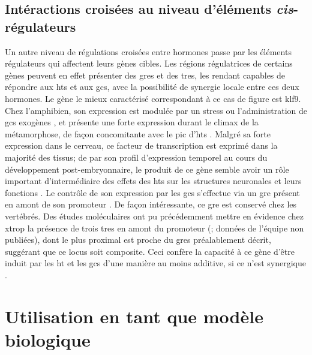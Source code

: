 \documentclass[../main.tex]{subfiles}
\begin{document}
	\subsection{Intéractions croisées au niveau d'éléments \textit{cis}-régulateurs}
		Un autre niveau de régulations croisées entre hormones passe par les éléments régulateurs qui affectent leurs gènes cibles.
		Les régions régulatrices de certains gènes peuvent en effet présenter des \glspl{gre} et des \glspl{tre}, les rendant capables de répondre aux \glspl{ht} et aux \glspl{gc}, avec la possibilité de synergie locale entre ces deux hormones.
		Le gène le mieux caractérisé correspondant à ce cas de figure est \gls{klf9}.
		Chez l'amphibien, son expression est modulée par un stress ou l'administration de \glspl{gc} exogènes \citep{Bonett2009}, et présente une forte expression durant le climax de la métamorphose, de façon concomitante avec le pic d'\glspl{ht} \citep{Das2009}.
		Malgré sa forte expression dans le cerveau, ce facteur de transcription est exprimé dans la majorité des tissus; de par son profil d'expression temporel au cours du développement post-embryonnaire, le produit de ce gène semble avoir un rôle important d'intermédiaire des effets des \glspl{ht} sur les structures neuronales et leurs fonctions \citep{Denver1999,Cayrou2002}.
		Le contrôle de son expression par les \glspl{gc} s'effectue via un \gls{gre} présent en amont de son promoteur \citep{Bagamasbad2012}.
		De façon intéressante, ce \gls{gre} est conservé chez les vertébrés.
		Des études moléculaires ont pu précédemment mettre en évidence chez \gls{xtrop} la présence de trois \glspl{tre} en amont du promoteur (\citealp{Furlow2002}; données de l'équipe non publiées), dont le plus proximal est proche du \glspl{gre} préalablement décrit, suggérant que ce locus soit composite.
		Ceci confère la capacité à ce gène d'être induit par les \gls{ht} et les \glspl{gc} d'une manière au moins additive, si ce n'est synergique \citep{Bonett2010}.




\section{Utilisation en tant que modèle biologique}
\end{document}

